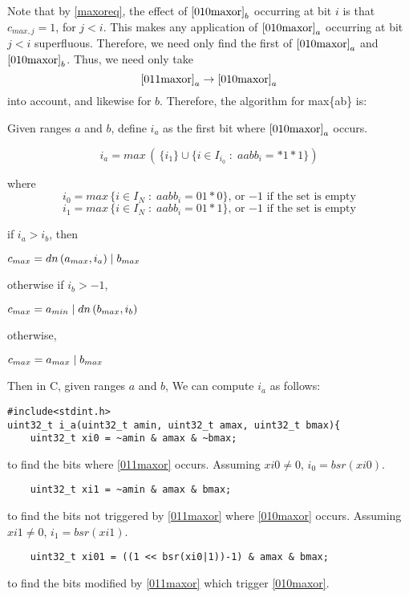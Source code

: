 \documentclass{article}
\begin{document}
Note that by \eqref{maxoreq}, the effect of $\eqref{010maxor}_b$ 
occurring at bit $i$ is that $c_{max,j} = 1$, for $j<i$. 
This makes any
application of $\eqref{010maxor}_a$ occurring at bit $j<i$ superfluous.
Therefore, we need only find the first of $\eqref{010maxor}_a$ and 
$\eqref{010maxor}_b$.
Thus, we need only take 
\begin{equation*} 
\eqref{011maxor}_a \rightarrow \eqref{010maxor}_a
\end{equation*}
into account, and likewise for $b$.
Therefore, the algorithm for max\{a\text{\textbar}b\} is:
\vspace{10pt}

Given ranges $a$ and $b$, define $i_a$ as the first bit where $\eqref{010maxor}_a$ occurs.

\begin{equation*}
i_a = 
max \, ( \, \{i_1\} \cup 
\{ i \in I_{i_0} \; : \; aabb_i = *1*1\} )
\end{equation*}

    where
\begin{equation*}
i_0 = max \, \{i \in I_N\; : \; 
aabb_i = 01*0\},\,
\text{or $-1$ if the set is empty}
\end{equation*}
\begin{equation*}
i_1 = max \, \{i\in I_N\; : \; 
aabb_i = 01*1\},\,
\text{or $-1$ if the set is empty}
\end{equation*}
\vspace{0pt}

if $i_a > i_b$, then

\quad $c_{max} = dn\,(a_{max},i_a) \; \text{\textbar} \; b_{max} $

otherwise if $i_b > -1$,

\quad $c_{max} = a_{min} \; \text{\textbar} \; dn\,(b_{max},i_b) $

otherwise,

\quad $c_{max} = a_{max} \; \text{\textbar} \; b_{max} $
\vspace{10pt}

Then in C, given ranges $a$ and $b$,
We can compute $i_a$ as follows:
\begin{lstlisting}
#include<stdint.h>
uint32_t i_a(uint32_t amin, uint32_t amax, uint32_t bmax){
    uint32_t xi0 = ~amin & amax & ~bmax;
\end{lstlisting}
to find the bits where \eqref{011maxor} occurs.
Assuming $xi0 \ne 0$, $i_0 = bsr(xi0)$.
\begin{lstlisting}
    uint32_t xi1 = ~amin & amax & bmax;
\end{lstlisting}
to find the bits not triggered by \eqref{011maxor} where \eqref{010maxor} 
occurs. 
Assuming $xi1 \ne 0$, $i_1 = bsr(xi1)$.
\begin{lstlisting}
    uint32_t xi01 = ((1 << bsr(xi0|1))-1) & amax & bmax;
\end{lstlisting}
to find the bits modified by \eqref{011maxor} which trigger \eqref{010maxor}.
\end{document}

